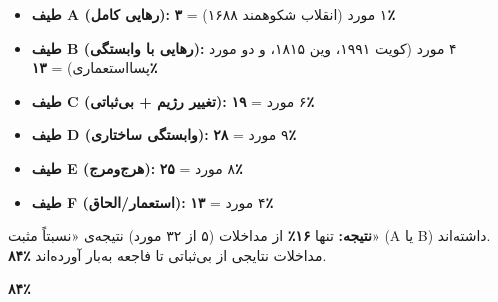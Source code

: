 \begin{tcolorbox}[wavebox, title={خلاصه‌ی آماری ۳۲ مورد مداخله}]
\begin{itemize}
\item \textbf{طیف A (رهایی کامل):} ۱ مورد (انقلاب شکوهمند ۱۶۸۸) = \textbf{۳٪}
\item \textbf{طیف B (رهایی با وابستگی):} ۴ مورد (کویت ۱۹۹۱، وین ۱۸۱۵، و دو مورد پسااستعماری) = \textbf{۱۳٪}
\item \textbf{طیف C (تغییر رژیم + بی‌ثباتی):} ۶ مورد = \textbf{۱۹٪}
\item \textbf{طیف D (وابستگی ساختاری):} ۹ مورد = \textbf{۲۸٪}
\item \textbf{طیف E (هرج‌ومرج):} ۸ مورد = \textbf{۲۵٪}
\item \textbf{طیف F (استعمار/الحاق):} ۴ مورد = \textbf{۱۳٪}
\end{itemize}

\textbf{نتیجه:} تنها \textbf{۱۶٪} از مداخلات (۵ از ۳۲ مورد) نتیجه‌ی «نسبتاً مثبت» (A یا B) داشته‌اند.\\
\textbf{۸۴٪} مداخلات نتایجی از بی‌ثباتی تا فاجعه به‌بار آورده‌اند.
\end{tcolorbox}

\begin{tcolorbox}[quotebox, title={یک عدد که همه‌چیز را خلاصه می‌کند}]
\begin{center}
\Huge\textbf{۸۴٪}\\[8pt]
\large{}\\[4pt]
\large{}
\end{center}
\end{tcolorbox}

\cleardoublepage